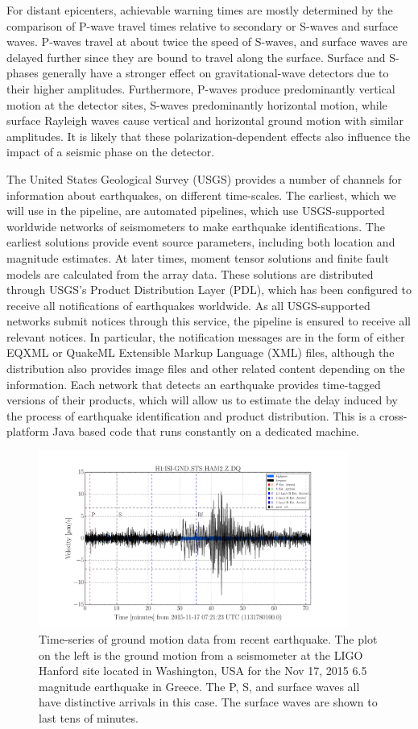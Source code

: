 \documentclass[reprint, prl, aps, showpacs]{revtex4-1}
\begin{document}
For distant epicenters, achievable warning times are mostly determined by the comparison of P-wave travel times relative to secondary or S-waves and surface waves. P-waves travel at about twice the speed of S-waves, and surface waves are delayed further since they are bound to travel along the surface. Surface and S-phases generally have a stronger effect on gravitational-wave detectors due to their higher amplitudes. Furthermore, P-waves produce predominantly vertical motion at the detector sites, S-waves predominantly horizontal motion, while surface Rayleigh waves cause vertical and horizontal ground motion with similar amplitudes. It is likely that these polarization-dependent effects also influence the impact of a seismic phase on the detector.

The United States Geological Survey (USGS) provides a number of channels for information about earthquakes, on different time-scales. The earliest, which we will use in the pipeline, are automated pipelines, which use USGS-supported worldwide networks of seismometers to make earthquake identifications. The earliest solutions provide event source parameters, including both location and magnitude estimates. At later times, moment tensor solutions and finite fault models are calculated from the array data. These solutions are distributed through USGS's Product Distribution Layer (PDL), which has been configured to receive all notifications of earthquakes worldwide. As all USGS-supported networks submit notices through this service, the pipeline is ensured to receive all relevant notices.
In particular, the notification messages are in the form of either EQXML or QuakeML Extensible Markup Language (XML) files, although the distribution also provides image files and other related content depending on the information. Each network that detects an earthquake provides time-tagged versions of their products, which will allow us to estimate the delay induced by the process of earthquake identification and product distribution. This is a cross-platform Java based code that runs constantly on a dedicated machine. 

\begin{figure}[t]
\hspace*{-0.5cm}
\centering
\includegraphics[width=4in]{timeseries.pdf}
\caption{Time-series of ground motion data from recent earthquake. The plot on the left is the ground motion from a seismometer at the LIGO Hanford site located in Washington, USA for the Nov 17, 2015 6.5 magnitude earthquake in Greece. The P, S, and surface waves all have distinctive arrivals in this case. The surface waves are shown to last tens of minutes.}
 \label{fig:timeseries}
 \end{figure}
\end{document}
